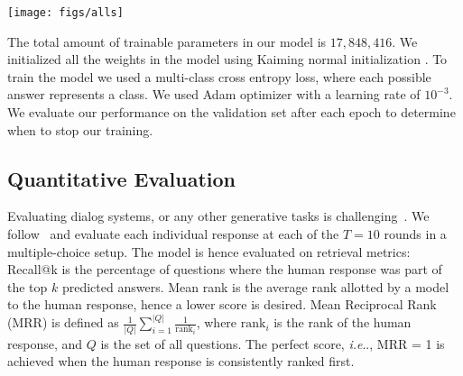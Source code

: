 \documentclass[10pt,twocolumn,letterpaper]{article}
\makeatletter
\def\@onedot{\ifx\@let@token.\else.\null\fi\xspace}
\DeclareRobustCommand\onedot{\futurelet\@let@token\@onedot}
\def\ie{\emph{i.e}\onedot} \def\Ie{\emph{I.e}\onedot}
\makeatother
\begin{document}
\begin{figure*}[t]
\vspace{-0.5cm}
\centering
\texttt{[image: figs/alls]}
\vspace{-0.8cm}
\caption{An illustration of question and image attention over a series of interactions for the same dialog. In addition we provide the ground truth answer, \ie, GT, and our predicted answer, \ie, A.}
	\label{fig:q_i}
	\vspace{-0.5cm}
\end{figure*}


 The total amount of trainable parameters in our model is $17,848,416$. We initialized all the weights in the model using Kaiming normal initialization \cite{he2015delving}. To train the model we used a multi-class cross entropy loss, where each possible answer represents a class. We used Adam optimizer with a learning rate of $10^{-3}$. We evaluate our performance on the validation set after each epoch to determine when to stop our training. 









\subsection{Quantitative Evaluation}
 Evaluating dialog systems, or any other generative tasks  is challenging~\cite{LiuEMNLP2016HowNOT}. We follow~\cite{visdial}  and evaluate each individual response at each of the $ T = 10 $ rounds in a multiple-choice setup. The model is hence evaluated on retrieval metrics:  Recall@k is the percentage of questions where the human response was part of the top $ k $ predicted answers. Mean rank is the average rank allotted by a model to the human response, hence a lower score is desired. Mean Reciprocal Rank (MRR) is defined as $\frac{1}{|{Q}|}\sum_{i=1}^{|Q|}\frac{1}{\text{rank}_i}$, where $\text{rank}_i$ is the rank of the human response, and $ Q $ is the set of all questions. The perfect score, \ie, MRR = 1 is achieved when the  human response is consistently ranked first.
\end{document}
